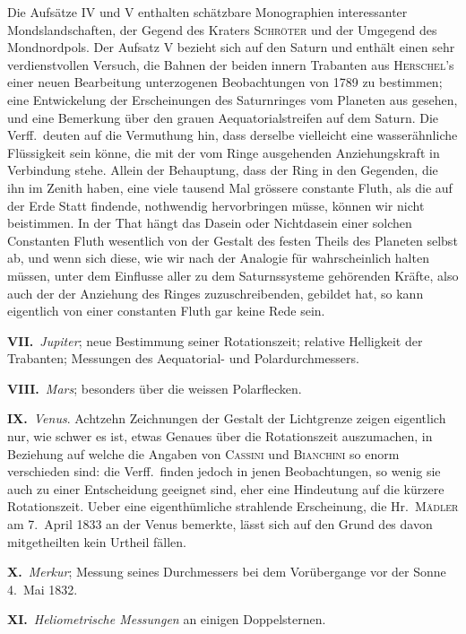 \documentclass[12pt,a4paper]{article}
\begin{document}
Die Aufs\"atze IV und V enthalten sch\"atzbare Monographien interessanter Mondslandschaften, der Gegend des Kraters \textsc{Schr\"oter} und der Umgegend des Mondnordpols. Der Aufsatz V bezieht sich auf den Saturn und enth\"alt einen sehr verdienstvollen Versuch, die Bahnen der beiden innern Trabanten aus \textsc{Herschel}'s einer neuen Bearbeitung unterzogenen Beobachtungen von 1789 zu bestimmen; eine Entwickelung der Erscheinungen des Saturnringes vom Planeten aus gesehen, und eine Bemerkung \"uber den grauen Aequatorialstreifen auf dem Saturn. Die Verff.\ deuten auf die Vermuthung hin, dass derselbe vielleicht eine wasser\"ahnliche Fl\"ussigkeit sein k\"onne, die mit der vom Ringe ausgehenden Anziehungskraft in Verbindung stehe. Allein der Behauptung, dass der Ring in den Gegenden, die ihn im Zenith haben, eine viele tausend Mal gr\"ossere constante Fluth, als die auf der Erde Statt findende, nothwendig hervorbringen m\"usse, k\"onnen wir nicht beistimmen. In der That h\"angt das Dasein oder Nichtdasein einer solchen Constanten Fluth wesentlich von der Gestalt des festen Theils des Planeten selbst ab, und wenn sich diese, wie wir nach der Analogie f\"ur wahrscheinlich halten m\"ussen, unter dem Einflusse aller zu dem Saturnssysteme geh\"orenden Kr\"afte, also auch der der Anziehung des Ringes zuzuschreibenden, gebildet hat, so kann eigentlich von einer constanten Fluth gar keine Rede sein.

\textbf{VII.}\ \textit{Jupiter}; neue Bestimmung seiner Rotationszeit; relative Helligkeit der Trabanten; Messungen des Aequatorial- und Polardurchmessers.

\textbf{VIII.}\ \textit{Mars}; besonders \"uber die weissen Polarflecken.

\textbf{IX.}\ \textit{Venus}. Achtzehn Zeichnungen der Gestalt der Lichtgrenze zeigen eigentlich nur, wie schwer es ist, etwas Genaues \"uber die Rotationszeit auszumachen, in Beziehung auf welche die Angaben von \textsc{Cassini} und \textsc{Bianchini} so enorm verschieden sind: die Verff.\ finden jedoch in jenen Beobachtungen, so wenig sie auch zu einer Entscheidung geeignet sind, eher eine Hindeutung auf die k\"urzere Rotationszeit. Ueber eine eigenth\"umliche strahlende Erscheinung, die Hr.\ \textsc{M\"adler} am 7.\ April 1833 an der Venus bemerkte, l\"asst sich auf den Grund des davon mitgetheilten kein Urtheil f\"allen.

\textbf{X.}\ \textit{Merkur}; Messung seines Durchmessers bei dem Vor\"ubergange vor der Sonne 4.\ Mai 1832.

\textbf{XI.}\ \textit{Heliometrische Messungen} an einigen Doppelsternen.
\end{document}
